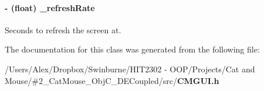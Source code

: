 \paragraph[{\-\_\-refresh\-Rate}]{\setlength{\rightskip}{0pt plus 5cm}-\/ (float) \-\_\-refresh\-Rate\hspace{0.3cm}{\ttfamily [protected]}}\label{interface_c_m_g_u_i_a1ba9b17e4241db45ccd3ba1086b83adb}


Seconds to refresh the screen at. 



The documentation for this class was generated from the following file\-:\begin{DoxyCompactItemize}
\item 
/\-Users/\-Alex/\-Dropbox/\-Swinburne/\-H\-I\-T2302 -\/ O\-O\-P/\-Projects/\-Cat and Mouse/\#2\-\_\-\-Cat\-Mouse\-\_\-\-Obj\-C\-\_\-\-D\-E\-Coupled/src/{\bf C\-M\-G\-U\-I.\-h}\end{DoxyCompactItemize}
